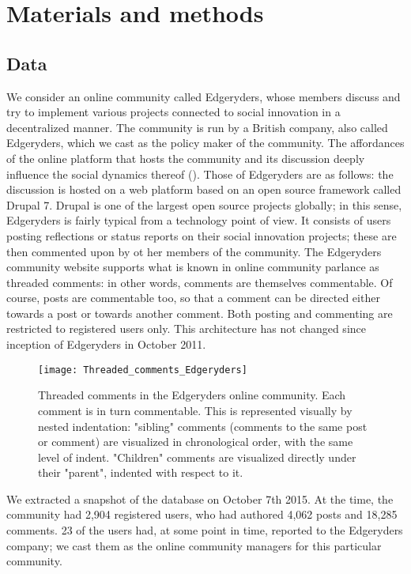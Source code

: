 \section{Materials and methods}

\subsection{Data}

We consider an online community called Edgeryders, whose members discuss and try to implement various projects connected to social innovation in a decentralized manner. The community is run by a British company, also called Edgeryders, which we cast as the policy maker of the community. The affordances of the online platform that hosts the community and its discussion deeply influence the social dynamics thereof (\cite{hodas2014simple}). Those of Edgeryders are as follows: the discussion is hosted on a web platform based on an open source framework called Drupal 7. Drupal is one of the largest open source projects globally; in this sense, Edgeryders is fairly typical from a technology point of view. It consists of users posting reflections or status reports on their social innovation projects; these are then commented upon by ot her members of the community. The Edgeryders community website supports what is known in online community parlance as threaded comments: in other words, comments are themselves commentable. Of course, posts are commentable too, so that a comment can be directed either towards a post or towards another comment. Both posting and commenting are restricted to registered users only. This architecture has not changed since inception of Edgeryders in October 2011.

\begin{figure}
	\texttt{[image: Threaded\_comments\_Edgeryders]}
	\caption{Threaded comments in the Edgeryders online community. Each comment is in turn commentable. This is represented visually by nested indentation: "sibling" comments (comments to the same post or comment) are visualized in chronological order, with the same level of indent. "Children" comments are visualized directly under their "parent", indented with respect to it.}
	\label{fig:threadedComments}
\end{figure}

We extracted a snapshot of the database on October 7th 2015. At the time, the community had 2,904 registered users, who had authored 4,062 posts and 18,285 comments. 23 of the users had, at some point in time, reported to the Edgeryders company; we cast them as the online community managers for this particular community. 	

